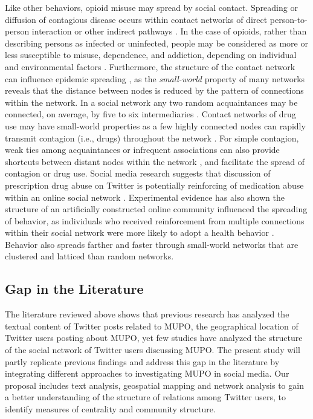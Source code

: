 \documentclass[sigconf]{acmart}
\begin{document}
Like other behaviors, opioid misuse may spread by social contact. Spreading 
or diffusion of contagious disease occurs within contact networks of direct 
person-to-person interaction or other indirect pathways \cite{pastor01}. In 
the case of opioids, rather than describing persons as infected or uninfected, 
people may be considered as more or less susceptible to misuse, dependence, and 
addiction, depending on individual and environmental factors \cite{volkow14}. 
Furthermore, the structure of the contact network can influence epidemic 
spreading \cite{watts98}, as the \emph{small-world} property of many networks 
reveals that the distance between nodes is reduced by the pattern of 
connections within the network. In a social network any two random acquaintances 
may be connected, on average, by five to six intermediaries \cite{travers69}. 
Contact networks of drug use may have small-world properties as a few highly 
connected nodes can rapidly transmit contagion (i.e., drugs) throughout the 
network \cite{shaham03}. For simple contagion, weak ties among acquaintances or 
infrequent associations can also provide shortcuts between distant nodes within 
the network \cite{granovetter73}, and facilitate the spread of contagion or 
drug use. Social media research suggests that discussion of prescription drug 
abuse on Twitter is potentially reinforcing of medication abuse within an 
online social network \cite{hanson13}. Experimental evidence has also shown 
the structure of an artificially constructed online community influenced the 
spreading of behavior, as individuals who received reinforcement from multiple 
connections within their social network were more likely to adopt a health
behavior \cite{centola10}. Behavior also spreads farther and faster through 
small-world networks that are clustered and latticed than random networks.


\subsection{Gap in the Literature} 

The literature reviewed above shows that previous research has analyzed the 
textual content of Twitter posts related to MUPO, the geographical location of 
Twitter users posting about MUPO, yet few studies have analyzed the structure 
of the social network of Twitter users discussing MUPO. The present study will 
partly replicate previous findings and address this gap in the literature by 
integrating different approaches to investigating MUPO in social media. Our 
proposal includes text analysis, geospatial mapping and network analysis to 
gain a better understanding of the structure of relations among Twitter users, 
to identify measures of centrality and community structure. 
\end{document}
